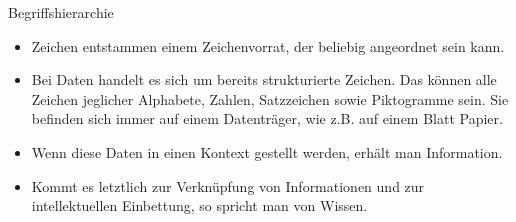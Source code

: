 Begriffshierarchie\\

\begin{itemize}
    \item Zeichen entstammen einem Zeichenvorrat, der beliebig angeordnet sein kann.
    \item Bei Daten handelt es sich um bereits strukturierte Zeichen. Das können alle Zeichen jeglicher Alphabete, Zahlen, Satzzeichen sowie Piktogramme sein. Sie befinden sich immer auf einem Datenträger, wie z.B. auf einem Blatt Papier.
    \item Wenn diese Daten in einen Kontext gestellt werden, erhält man Information.
    \item Kommt es letztlich zur Verknüpfung von Informationen und zur intellektuellen Einbettung, so spricht man von Wissen.
\end{itemize}


